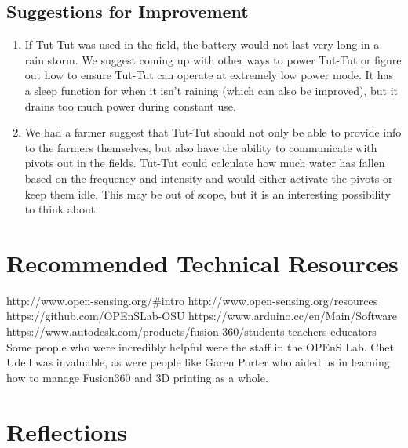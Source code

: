 \documentclass[letterpaper,10pt,draftclsnofoot,onecolumn]{article}
\begin{document}
\subsection{Suggestions for Improvement}
\begin{enumerate}
    \item If Tut-Tut was used in the field, the battery would not last very long in a rain storm. We suggest coming up with other ways to power Tut-Tut or figure out how to ensure Tut-Tut can operate at extremely low power mode. It has a sleep function for when it isn't raining (which can also be improved), but it drains too much power during constant use.
    \item We had a farmer suggest that Tut-Tut should not only be able to provide info to the farmers themselves, but also have the ability to communicate with pivots out in the fields. Tut-Tut could calculate how much water has fallen based on the frequency and intensity and would either activate the pivots or keep them idle. This may be out of scope, but it is an interesting possibility to think about.
\end{enumerate}

\section{Recommended Technical Resources}
http://www.open-sensing.org/\#intro
\newline
http://www.open-sensing.org/resources
\newline
https://github.com/OPEnSLab-OSU
\newline
https://www.arduino.cc/en/Main/Software
\newline
https://www.autodesk.com/products/fusion-360/students-teachers-educators
\newline
\newline
Some people who were incredibly helpful were the staff in the OPEnS Lab. Chet Udell was invaluable, as were people like Garen Porter who aided us in learning how to manage Fusion360 and 3D printing as a whole.

\section{Reflections}
\end{document}
